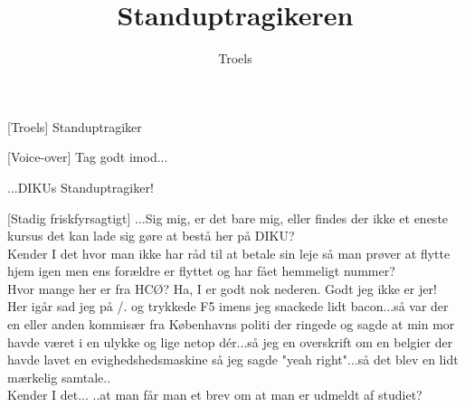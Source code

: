 \documentclass[a4paper,11pt]{article}
\title{Standuptragikeren}
\author{Troels}
\begin{document}
\maketitle

\begin{roles}
[Troels] Standuptragiker
\end{roles}


\begin{sketch}

 [Voice-over] Tag godt imod...


 ...DIKUs Standuptragiker!


[Stadig friskfyrsagtigt] ...Sig mig, er det bare mig, eller findes der ikke et eneste kursus det kan lade sig gøre at bestå her på DIKU?\\

Kender I det hvor man ikke har råd til at betale sin leje så man prøver at flytte hjem igen men ens forældre er flyttet og har fået hemmeligt nummer?\\

Hvor mange her er fra HCØ?  Ha, I er godt nok nederen. Godt jeg ikke er jer!\\
Her igår sad jeg på /. og trykkede F5 imens jeg snackede lidt bacon...så var der en eller anden kommisær fra Københavns politi der ringede og sagde at min mor havde været i en ulykke og lige netop dér...så jeg en overskrift om en belgier der havde lavet en evighedshedsmaskine så jeg sagde "yeah right"...så det blev en lidt mærkelig samtale..\\

Kender I det... ..at man får man et brev om at man er udmeldt af studiet? \\


\end{sketch}
\end{document}

